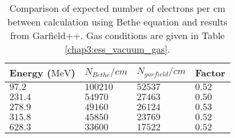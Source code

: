 \begin{table}[ht]%
	\centering
	\caption[Comparison of expected number of electrons per $\mathrm{cm}$ between calculation using Bethe equation and results from Garfield++]
	{Comparison of expected number of electrons per $\mathrm{cm}$ between calculation using Bethe equation and results from Garfield++. Gas conditions are given in Table \ref{chap3:ess_vacuum_gas}.}
	\label{chap3:GarfieldBethe}
	\begin{tabularx}{\linewidth}{XXXX}
		\toprule
		Energy ($\mathrm{MeV}$) & \(N_{Bethe}/cm\) & \(N_{garfield}/cm\) & Factor   \\
		\midrule
		\(97.2\)                & \(100210\)       & \(52537\)           & \(0.52\) \\
		\(231.4\)               & \(54970\)        & \(27463\)           & \(0.50\) \\
		\(278.9\)               & \(49160\)        & \(26124\)           & \(0.53\) \\
		\(315.8\)               & \(45850\)        & \(23769\)           & \(0.52\) \\
		\(628.3\)               & \(33600\)        & \(17522\)           & \(0.52\) \\
		\bottomrule
	\end{tabularx}
\end{table}